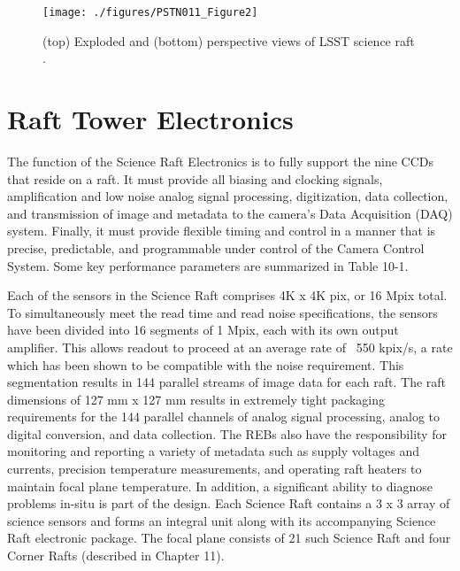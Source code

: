 \begin{figure}[htbp]
\begin{center}
\texttt{[image: ./figures/PSTN011\_Figure2]}
\caption{(top) Exploded and (bottom) perspective views of LSST science raft .}
\label{fig:Fig2}
\end{center}
\end{figure}

\section{Raft Tower Electronics}
The function of the Science Raft Electronics is to fully support the nine CCDs that reside on a raft. It must provide all biasing and clocking signals, amplification and low noise analog signal processing, digitization, data collection, and transmission of image and metadata to the camera’s Data Acquisition (DAQ) system. Finally, it must provide flexible timing and control in a manner that is precise, predictable, and programmable under control of the Camera Control System. Some key performance parameters are summarized in Table 10-1.

%
%
%
%
%
%
%
%
%
%
%

Each of the sensors in the Science Raft comprises 4K x 4K pix, or 16 Mpix total. To simultaneously meet the read time and read noise specifications, the sensors have been divided into 16 segments of 1 Mpix, each with its own output amplifier. This allows readout to proceed at an average rate of ~550 kpix/s, a rate which has been shown to be compatible with the noise requirement. This segmentation results in 144 parallel streams of image data for each raft. The raft dimensions of 127 mm x 127 mm results in extremely tight packaging requirements for the 144 parallel channels of analog signal processing, analog to digital conversion, and data collection. 
The REBs also have the responsibility for monitoring and reporting a variety of metadata such as supply voltages and currents, precision temperature measurements, and operating raft heaters to maintain focal plane temperature. In addition, a significant ability to diagnose problems in-situ is part of the design. 
Each Science Raft contains a 3 x 3 array of science sensors and forms an integral unit along with its accompanying Science Raft electronic package. The focal plane consists of 21 such Science Raft and four Corner Rafts (described in Chapter 11). 

